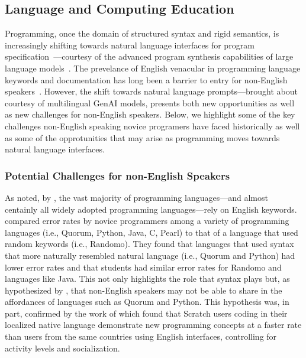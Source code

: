 \subsection{Language and Computing Education}

Programming, once the domain of structured syntax and rigid semantics, is
increasingly shifting towards natural language interfaces for program
specification~\cite{lau2023ban, prather2025beyond, chen2025empirical,
petrovska2024incorporating}---courtesy of the advanced program synthesis
capabilities of large language models~\cite{austin2021program, jimenezswe}. The
prevelance of English venacular in programming language keywords and
documentation has long been a barrier to entry for non-English
speakers~\cite{guo2018non}. However, the shift towards natural language
prompts---brought about courtesy of multilingual GenAI models, presents both
new opportunities as well as new challenges for non-English speakers. Below, we
highlight some of the key challenges non-English speaking novice programers
have faced historically as well as some of the opprotunities that may arise as
programming moves towards natural language interfaces.

\subsubsection{Potential Challenges for non-English Speakers}



As noted, by \citet{guo2018non}, the vast majority of programming
languages---and almost centainly all widely adopted programming
languages---rely on English keywords. \citet{stefik2013emperical} compared
error rates by novice programmers among a variety of programming languages
(i.e., Quorum, Python, Java, C, Pearl) to that of a language that used random
keywords (i.e., Randomo). They found that languages that used syntax that more
naturally resembled natural language (i.e., Quorum and Python) had lower error
rates and that students had similar error rates for Randomo and languages like
Java. This not only highlights the role that syntax plays but, as hypothesized
by \citet{becker2019parlez}, that non-English speakers may not be able
to share in the affordances of languages such as Quorum and Python. This
hypothesis was, in part, confirmed by the work of \citet{dasgupta2017learning}
which found that Scratch users coding in their localized native language
demonstrate new programming concepts at a faster rate than users from the same
countries using English interfaces, controlling for activity levels and
socialization. 


